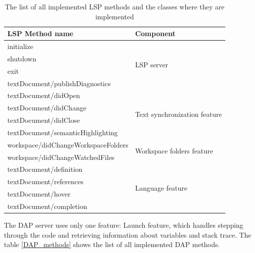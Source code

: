 \begin{table}
	\centering
	\begin{tabular}{ll}
		\toprule
		\textbf{LSP Method name}            & \textbf{Component}                              \\ \midrule
		initialize                          & \multirow{4}{5cm}{LSP server}                   \\
		shutdown                            &                                                 \\
		exit                                &                                                 \\
		textDocument/publishDiagnostics     &                                                 \\ \midrule
		textDocument/didOpen                & \multirow{4}{5cm}{Text synchronization feature} \\
		textDocument/didChange              &                                                 \\
		textDocument/didClose               &                                                 \\
		textDocument/semanticHighlighting   &                                                 \\ \midrule
		workspace/didChangeWorkspaceFolders & \multirow{2}{5cm}{Workspace folders feature}    \\
		workspace/didChangeWatchedFiles     &                                                 \\ \midrule
		textDocument/definition             & \multirow{4}{5cm}{Language feature}             \\
		textDocument/references             &                                                 \\
		textDocument/hover                  &                                                 \\
		textDocument/completion             &                                                 \\ \bottomrule
	\end{tabular}
	\caption{The list of all implemented LSP methods and the classes where they are implemented}
	\label{LSP_methods}
\end{table}

The DAP server uses only one feature: Launch feature, which handles stepping through the code and retrieving information about variables and stack trace. The table \cref{DAP_methods} shows the list of all implemented DAP methods.

